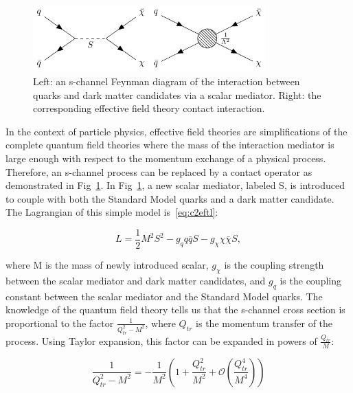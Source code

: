 \begin{figure}[htbp]
  \begin{center}
    \includegraphics[width=0.8\textwidth]{chapters/c2/figures/eft-feyn-diagram}
  \end{center}
  \caption{Left: an s-channel Feynman diagram of the interaction between quarks and dark matter candidates via a scalar mediator. Right: the corresponding effective field theory contact interaction.}
  \label{fig:c2eftfeyndiagram}
\end{figure}

In the context of particle physics, effective field theories are simplifications of the complete quantum field theories where the mass of the interaction mediator is large enough with respect to the momentum exchange of a physical process. Therefore, an s-channel process can be replaced by a contact operator as demonstrated in Fig~\ref{fig:c2eftfeyndiagram}. In Fig~\ref{fig:c2eftfeyndiagram}, a new scalar mediator, labeled S, is introduced to couple with both the Standard Model quarks and a dark matter candidate. The Lagrangian of this simple model is~\ref{eq:c2eftl}:

\begin{equation}
  L = \frac{1}{2}M^{2}S^{2}-g_{q}q\bar{q}S-g_{\chi}\chi\bar{\chi}S,
  \label{eq:c2eftl}
\end{equation}

where M is the mass of newly introduced scalar, $g_{\chi}$ is the coupling strength between the scalar mediator and dark matter candidates, and $g_{q}$ is the coupling constant between the scalar mediator and the Standard Model quarks. The knowledge of the quantum field theory tells us that the s-channel cross section is proportional to the factor $\frac{1}{Q_{tr}^{2}-M^{2}}$, where $Q_{tr}$ is the momentum transfer of the process. Using Taylor expansion, this factor can be expanded in powers of $\frac{Q_{tr}}{M}$: 

\begin{equation}
  \frac{1}{Q^{2}_{tr}-M^{2}} = -\frac{1}{M^{2}}(1+\frac{Q^{2}_{tr}}{M^{2}}+\mathcal{O}(\frac{Q^{4}_{tr}}{M^{4}}))
  \label{eq:c2taylorexp}
\end{equation}

